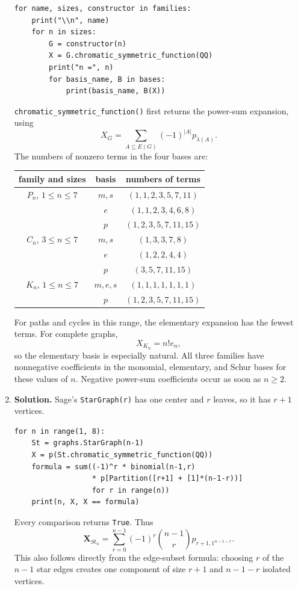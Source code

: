 \documentclass{article}
\begin{document}
\begin{enumerate}
\begin{verbatim}
for name, sizes, constructor in families:
    print("\\n", name)
    for n in sizes:
        G = constructor(n)
        X = G.chromatic_symmetric_function(QQ)
        print("n =", n)
        for basis_name, B in bases:
            print(basis_name, B(X))
\end{verbatim}
\texttt{chromatic\_symmetric\_function()} first returns the power-sum
expansion, using
\[
X_G=\sum_{A\subseteq E(G)}(-1)^{|A|}p_{\lambda(A)}.
\]
The numbers of nonzero terms in the four bases are:
\begin{center}
\small
\begin{tabular}{c|c|c}
family and sizes & basis & numbers of terms\\ \hline
$P_n$, $1\leq n\leq7$ & $m,s$ & $(1,1,2,3,5,7,11)$\\
 & $e$ & $(1,1,2,3,4,6,8)$\\
 & $p$ & $(1,2,3,5,7,11,15)$\\ \hline
$C_n$, $3\leq n\leq7$ & $m,s$ & $(1,3,3,7,8)$\\
 & $e$ & $(1,2,2,4,4)$\\
 & $p$ & $(3,5,7,11,15)$\\ \hline
$K_n$, $1\leq n\leq7$ & $m,e,s$ & $(1,1,1,1,1,1,1)$\\
 & $p$ & $(1,2,3,5,7,11,15)$
\end{tabular}
\end{center}
For paths and cycles in this range, the elementary expansion has the
fewest terms.  For complete graphs,
\[
X_{K_n}=n!e_n,
\]
so the elementary basis is especially natural.  All three families
have nonnegative coefficients in the monomial, elementary, and Schur
bases for these values of $n$.  Negative power-sum coefficients occur
as soon as $n\geq2$.

\item \textbf{Solution.}
Sage's \texttt{StarGraph(r)} has one center and $r$ leaves, so it has
$r+1$ vertices.
\begin{verbatim}
for n in range(1, 8):
    St = graphs.StarGraph(n-1)
    X = p(St.chromatic_symmetric_function(QQ))
    formula = sum((-1)^r * binomial(n-1,r)
                  * p[Partition([r+1] + [1]*(n-1-r))]
                  for r in range(n))
    print(n, X, X == formula)
\end{verbatim}
Every comparison returns \texttt{True}.  Thus
\[
\mathbf{X}_{St_n}
=\sum_{r=0}^{n-1}(-1)^r\binom{n-1}{r}
p_{r+1,1^{n-1-r}}.
\]
This also follows directly from the edge-subset formula: choosing $r$
of the $n-1$ star edges creates one component of size $r+1$ and
$n-1-r$ isolated vertices.


\end{enumerate}
\end{document}
